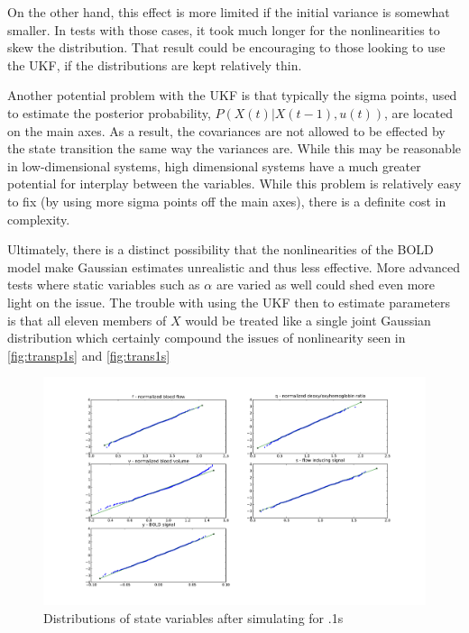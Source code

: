On the other hand, this effect is more limited if the initial variance is somewhat
smaller. In tests with those cases, it took much longer for the nonlinearities to skew
the distribution. That result could be encouraging to those looking to use the
UKF, if the distributions are kept relatively thin.

Another potential problem with the UKF is that typically the sigma points,
used to estimate the posterior probability, $P(X(t) | X(t-1), u(t))$, are
located on the main axes. As a result, the covariances are not allowed to 
be effected by the state transition the same way the variances are. While
this may be reasonable in low-dimensional systems, high dimensional systems
have a much greater potential for interplay between the variables. While
this problem is relatively easy to fix (by using more sigma points off
the main axes), there is a definite cost in complexity.

Ultimately, there is a distinct possibility that the nonlinearities of 
the BOLD model make Gaussian estimates unrealistic and thus less effective.
More advanced tests where static variables such as $\alpha$ are varied
as well could shed even more light on the issue. The trouble with using
the UKF then to estimate parameters is that all eleven members of $X$ would
be treated like a single joint Gaussian distribution which certainly 
compound the issues of nonlinearity seen in \autoref{fig:transp1s} and 
\autoref{fig:trans1s}

\begin{figure}
\centering
\includegraphics[trim=6cm .75cm 6cm .75cm,width=16cm]{images/gauss_step_point1sec_3sigma.pdf}
\caption{Distributions of state variables after simulating for .1s}
\label{fig:transp1s}
\end{figure}

